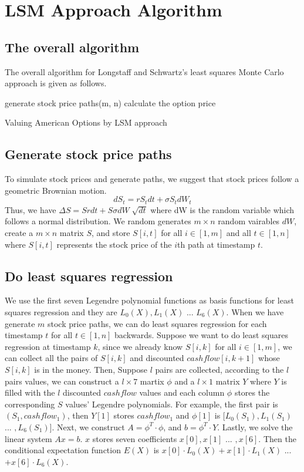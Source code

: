 \documentclass[11pt, oneside]{article}   	%
\begin{document}
\section{LSM Approach Algorithm}
\subsection{The overall algorithm}
The overall algorithm for Longstaff and Schwartz's least squares Monte Carlo approach is given as follows.\newline
\begin{algorithm}[H]
\SetAlgoLined
generate stock price paths(m, n)\;
calculate the option price\;
\caption{Valuing American Options by LSM approach}
\end{algorithm}

\subsection{Generate stock price paths}
To simulate stock prices and generate paths, we suggest that stock prices follow a geometric Brownian motion.
\begin{equation}
dS_t = rS_tdt + \sigma S_tdW_t
\end{equation}
Thus, we have $\Delta S = Srdt + S\sigma dW \sqrt[]{dt}$ where dW is the random variable which follows a normal distribution. We random generates $m \times n$ random vairables $dW$, create a $m \times n$ matrix $S$, and store $S[i, t]$ for all $i \in [1,m] $ and all $t \in [1,n] $where $S[i, t]$ represents the stock price of the $i$th path at timestamp $t$.

\subsection{Do least squares regression}
We use the first seven Legendre polynomial functions as basis functions for least squares regression and they are $L_0(X), L_1(X)$ ... $L_6(X)$.\newline
\newline
When we have generate $m$ stock price paths, we can do least squares regression for each timestamp $t$ for all $t \in [1, n]$ backwards. Suppose we want to do least squares regression at timestamp $k$, since we already know $S[i, k]$ for all $i \in [1, m]$, we can collect all the pairs of $S[i, k]$ and discounted $cashflow[i, k+1]$ whose $S[i, k]$ is in the money. Then, Suppose $l$ pairs are collected, according to the $l$ pairs values, we can construct a $l\times7$ martix $\phi$ and a $l \times 1$ matrix $Y$ where $Y$ is filled with the $l$ discounted $cashflow$ values and each column $\phi$ stores the corresponding $S$ values' Legendre polynomials. For example, the first pair is $(S_1, cashflow_1)$, then $Y[1]$ stores $cashflow_1$ and $\phi[1]$ is $[L_0(S_1),L_1(S_1)$ ... $,L_6(S_1)]$. Next, we construct $A = \phi^T \cdot \phi$, and $b = \phi^T \cdot Y$. Lastly, we solve the linear system $Ax = b$. $x$ stores seven coefficients  $x[0], x[1]$ ... $,x[6]$. Then the conditional expectation function $E(X)$ is $x[0] \cdot L_0(X) + x[1] \cdot L_1(X)  $ ... $ + x[6] \cdot L_6(X)$.
\end{document}
